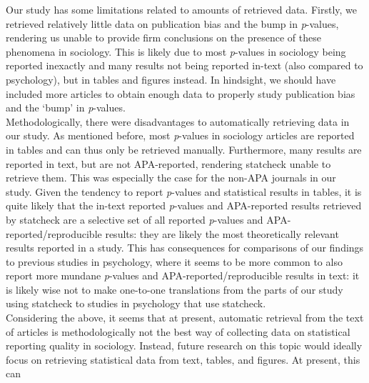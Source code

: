 \documentclass[
  12pt,
]{article}
\begin{document}
Our study has some limitations related to amounts of retrieved data.
Firstly, we retrieved relatively little data on publication bias and the
bump in \emph{p}-values, rendering us unable to provide firm conclusions
on the presence of these phenomena in sociology. This is likely due to
most \emph{p}-values in sociology being reported inexactly and many
results not being reported in-text (also compared to psychology), but in
tables and figures instead. In hindsight, we should have included more
articles to obtain enough data to properly study publication bias and
the `bump' in \emph{p}-values.~\\
\hspace*{0.333em}\hspace*{0.333em}\hspace*{0.333em}\hspace*{0.333em}Methodologically,
there were disadvantages to automatically retrieving data in our study.
As mentioned before, most \emph{p}-values in sociology articles are
reported in tables and can thus only be retrieved manually. Furthermore,
many results are reported in text, but are not APA-reported, rendering
statcheck unable to retrieve them. This was especially the case for the
non-APA journals in our study. Given the tendency to report
\emph{p}-values and statistical results in tables, it is quite likely
that the in-text reported \emph{p}-values and APA-reported results
retrieved by statcheck are a selective set of all reported
\emph{p}-values and APA-reported/reproducible results: they are likely
the most theoretically relevant results reported in a study. This has
consequences for comparisons of our findings to previous studies in
psychology, where it seems to be more common to also report more mundane
\emph{p}-values and APA-reported/reproducible results in text: it is
likely wise not to make one-to-one translations from the parts of our
study using statcheck to studies in psychology that use statcheck.\\
\hspace*{0.333em}\hspace*{0.333em}\hspace*{0.333em}\hspace*{0.333em}
Considering the above, it seems that at present, automatic retrieval
from the text of articles is methodologically not the best way of
collecting data on statistical reporting quality in sociology. Instead,
future research on this topic would ideally focus on retrieving
statistical data from text, tables, and figures. At present, this can
\end{document}
